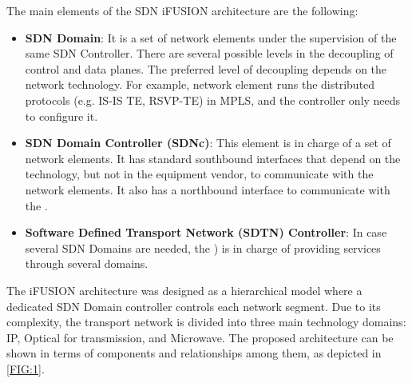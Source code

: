 \documentclass[10pt, conference]{IEEEtran}
\begin{document}
The main elements of the SDN i\uppercase{FUSION} architecture are the following:

\begin{itemize}
\item \textbf{SDN Domain}: It is a set of network elements under the supervision of the same SDN Controller. There are several possible levels in the decoupling of control and data planes. The preferred level of decoupling depends on the network technology. For example, network element runs the distributed protocols (e.g. IS-IS TE, RSVP-TE) in MPLS, and the controller only needs to configure it.


\item \textbf{SDN Domain Controller (SDNc)}: This element is in charge of a set of network elements. It has standard southbound interfaces that depend on the technology, but not in the equipment vendor, to communicate with the network elements. It also has a northbound interface to communicate with the .

\item \textbf{Software Defined Transport Network (SDTN) Controller}: In case several SDN Domains are needed, the ) is in charge of providing services through several domains. 


\end{itemize}

The i\uppercase{FUSION} architecture was designed as a hierarchical model where a dedicated SDN Domain controller controls each network segment. Due to its complexity, the transport network is divided into three main technology domains: IP, Optical for transmission, and Microwave.  The proposed architecture can be shown in terms of components and relationships among them, as depicted in \cref{FIG:1}. 
\end{document}
